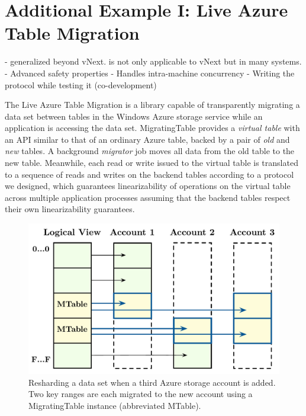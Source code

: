 \section{Additional Example I: Live Azure Table Migration}
\label{sec:cases:migration}

- \psharp generalized beyond vNext. \psharp is not only applicable to vNext but in many systems.
- Advanced safety properties
- Handles intra-machine concurrency
- Writing the protocol while testing it (co-development)

The Live Azure Table Migration is a library capable of transparently migrating a data set between tables in the Windows Azure storage service while an application is accessing the data set.  MigratingTable provides a \emph{virtual table} with an API similar to that of an ordinary Azure table, backed by a pair of \emph{old} and \emph{new} tables.  A background \emph{migrator} job moves all data from the old table to the new table.  Meanwhile, each read or write issued to the virtual table is translated to a sequence of reads and writes on the backend tables according to a protocol we designed, which guarantees linearizability of operations on the virtual table across multiple application processes assuming that the backend tables respect their own linearizability guarantees.

\begin{figure}[t]
\centering
\includegraphics[width=\linewidth]{img/livemigration}
\caption{Resharding a data set when a third Azure storage account is added. Two key ranges are each migrated to the new account using a MigratingTable instance (abbreviated MTable).}
\label{fig:livemigration}
\end{figure}


